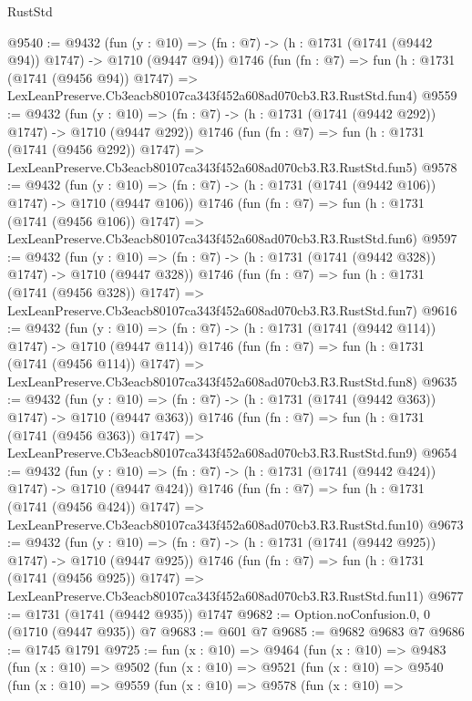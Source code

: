 \begin{lexlean}{RustStd}
\begin{coremodule}
@9540 := @9432
    (fun (y : @10) => (fn : @7) -> (h : @1731 (@1741 (@9442 @94)) @1747) -> @1710 (@9447 @94))
    @1746
    (fun (fn : @7) =>
    fun (h : @1731 (@1741 (@9456 @94)) @1747) =>
    LexLeanPreserve.Cb3eacb80107ca343f452a608ad070cb3.R3.RustStd.fun4)
@9559 := @9432
    (fun (y : @10) => (fn : @7) -> (h : @1731 (@1741 (@9442 @292)) @1747) -> @1710 (@9447 @292))
    @1746
    (fun (fn : @7) =>
    fun (h : @1731 (@1741 (@9456 @292)) @1747) =>
    LexLeanPreserve.Cb3eacb80107ca343f452a608ad070cb3.R3.RustStd.fun5)
@9578 := @9432
    (fun (y : @10) => (fn : @7) -> (h : @1731 (@1741 (@9442 @106)) @1747) -> @1710 (@9447 @106))
    @1746
    (fun (fn : @7) =>
    fun (h : @1731 (@1741 (@9456 @106)) @1747) =>
    LexLeanPreserve.Cb3eacb80107ca343f452a608ad070cb3.R3.RustStd.fun6)
@9597 := @9432
    (fun (y : @10) => (fn : @7) -> (h : @1731 (@1741 (@9442 @328)) @1747) -> @1710 (@9447 @328))
    @1746
    (fun (fn : @7) =>
    fun (h : @1731 (@1741 (@9456 @328)) @1747) =>
    LexLeanPreserve.Cb3eacb80107ca343f452a608ad070cb3.R3.RustStd.fun7)
@9616 := @9432
    (fun (y : @10) => (fn : @7) -> (h : @1731 (@1741 (@9442 @114)) @1747) -> @1710 (@9447 @114))
    @1746
    (fun (fn : @7) =>
    fun (h : @1731 (@1741 (@9456 @114)) @1747) =>
    LexLeanPreserve.Cb3eacb80107ca343f452a608ad070cb3.R3.RustStd.fun8)
@9635 := @9432
    (fun (y : @10) => (fn : @7) -> (h : @1731 (@1741 (@9442 @363)) @1747) -> @1710 (@9447 @363))
    @1746
    (fun (fn : @7) =>
    fun (h : @1731 (@1741 (@9456 @363)) @1747) =>
    LexLeanPreserve.Cb3eacb80107ca343f452a608ad070cb3.R3.RustStd.fun9)
@9654 := @9432
    (fun (y : @10) => (fn : @7) -> (h : @1731 (@1741 (@9442 @424)) @1747) -> @1710 (@9447 @424))
    @1746
    (fun (fn : @7) =>
    fun (h : @1731 (@1741 (@9456 @424)) @1747) =>
    LexLeanPreserve.Cb3eacb80107ca343f452a608ad070cb3.R3.RustStd.fun10)
@9673 := @9432
    (fun (y : @10) => (fn : @7) -> (h : @1731 (@1741 (@9442 @925)) @1747) -> @1710 (@9447 @925))
    @1746
    (fun (fn : @7) =>
    fun (h : @1731 (@1741 (@9456 @925)) @1747) =>
    LexLeanPreserve.Cb3eacb80107ca343f452a608ad070cb3.R3.RustStd.fun11)
@9677 := @1731 (@1741 (@9442 @935)) @1747
@9682 := Option.noConfusion.{0, 0} (@1710 (@9447 @935)) @7
@9683 := @601 @7
@9685 := @9682 @9683 @7
@9686 := @1745 @1791
@9725 := fun (x : @10) =>
  @9464
    (fun (x : @10) =>
    @9483
      (fun (x : @10) =>
      @9502
        (fun (x : @10) =>
        @9521
          (fun (x : @10) =>
          @9540
            (fun (x : @10) =>
            @9559
              (fun (x : @10) =>
              @9578
                (fun (x : @10) =>

\end{coremodule}
\end{lexlean}
